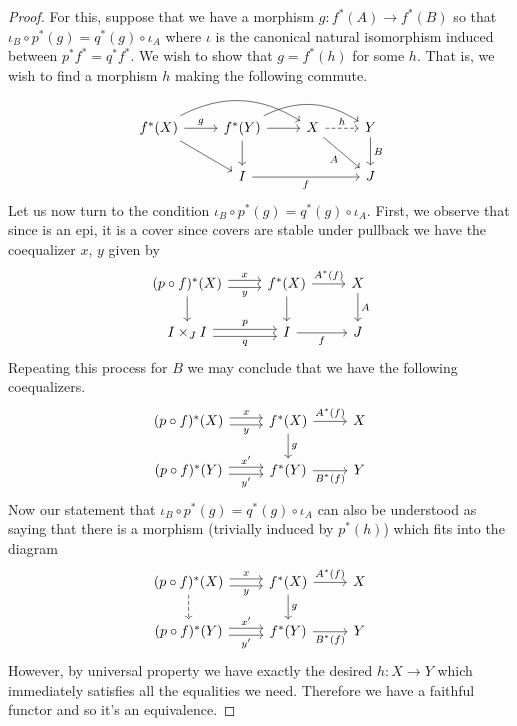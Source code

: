 \begin{proof}
  For this, suppose that we have a morphism $g : f^*(A) \to f^*(B)$ so
  that $\iota_B \circ p^*(g) = q^*(g) \circ \iota_A$ where $\iota$ is
  the canonical natural isomorphism induced between $p^*f^* =
  q^*f^*$. We wish to show that $g = f^*(h)$ for some $h$. That is, we
  wish to find a morphism $h$ making the following commute.
  \[
    \begin{tikzcd}
      f^*(X) \ar[dr] \ar[rr, bend left] \ar[r, "g"] &
      f^*(Y) \ar[d] \ar[r] \ar[bend left, rr] &
      X \ar[dr, swap, "A"] \ar[r, dashed, "h"] &
      Y \ar[d, "B"]\\
      & I \ar[rr, swap, "f"] & & J
    \end{tikzcd}
  \]
  Let us now turn to the condition
  $\iota_B \circ p^*(g) = q^*(g) \circ \iota_A$. First, we observe
  that since is an epi, it is a cover since covers are stable under
  pullback we have the coequalizer $x$, $y$ given by
  \[
    \begin{tikzcd}
      (p \circ f)^*(X) \ar[d] \ar[r, shift left=.25em, "x"] \ar[r, shift right=.25em, swap, "y"] &
      f^*(X) \ar[r, "A^*(f)"] \ar[d] &
      X \ar[d, "A"]\\
      I \times_J I \ar[r, "p", shift left=.25em] \ar[r, swap, shift right=.25em, "q"] &
      I \ar[r, swap, "f"] &
      J
    \end{tikzcd}
  \]
  Repeating this process for $B$ we may conclude that we have the
  following coequalizers.
  \[
    \begin{tikzcd}
      (p \circ f)^*(X) \ar[r, shift left=.25em, "x"] \ar[r, shift right=.25em, swap, "y"] &
      f^*(X) \ar[r, "A^*(f)"] \ar[d, "g"] &
      X\\
      (p \circ f)^*(Y) \ar[r, shift left=.25em, "x'"] \ar[r, shift right=.25em, swap, "y'"] &
      f^*(Y) \ar[r, swap, "B^*(f)"] &
      Y
    \end{tikzcd}
  \]
  Now our statement that $\iota_B \circ p^*(g) = q^*(g) \circ \iota_A$
  can also be understood as saying that there is a morphism (trivially
  induced by $p^*(h)$) which fits into the diagram
  \[
    \begin{tikzcd}
      (p \circ f)^*(X) \ar[r, shift left=.25em, "x"] \ar[r, shift right=.25em, swap, "y"] \ar[d, dashed] &
      f^*(X) \ar[r, "A^*(f)"] \ar[d, "g"] &
      X\\
      (p \circ f)^*(Y) \ar[r, shift left=.25em, "x'"] \ar[r, shift right=.25em, swap, "y'"] &
      f^*(Y) \ar[r, swap, "B^*(f)"] &
      Y
    \end{tikzcd}
  \]
  However, by universal property we have exactly the desired
  $h : X \to Y$ which immediately satisfies all the equalities we
  need. Therefore we have a faithful functor and so it's an
  equivalence.
\end{proof}

